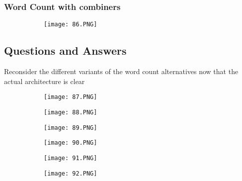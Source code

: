 \documentclass{article}
\begin{document}
\subsubsection{Word Count with combiners}

\begin{figure}[ht!]
  \centering
  \begin{subfigure}[b]{0.5\linewidth}
    \texttt{[image: 86.PNG]}
  \end{subfigure}
\end{figure}

\subsection{Questions and Answers}

Reconsider the different variants of the word count alternatives now that the actual architecture is clear

\begin{figure}[ht!]
  \centering
  \begin{subfigure}[b]{0.5\linewidth}
    \texttt{[image: 87.PNG]}
  \end{subfigure}
     \begin{subfigure}[b]{0.4\textwidth}
         \centering
         \texttt{[image: 88.PNG]}
     \end{subfigure}
\end{figure}

\begin{figure}[ht!]
  \centering
  \begin{subfigure}[b]{0.5\linewidth}
    \texttt{[image: 89.PNG]}
  \end{subfigure}
     \begin{subfigure}[b]{0.4\textwidth}
         \centering
         \texttt{[image: 90.PNG]}
     \end{subfigure}
\end{figure}

\begin{figure}[ht!]
  \centering
  \begin{subfigure}[b]{0.5\linewidth}
    \texttt{[image: 91.PNG]}
  \end{subfigure}
     \begin{subfigure}[b]{0.4\textwidth}
         \centering
         \texttt{[image: 92.PNG]}
     \end{subfigure}
\end{figure}
\end{document}
